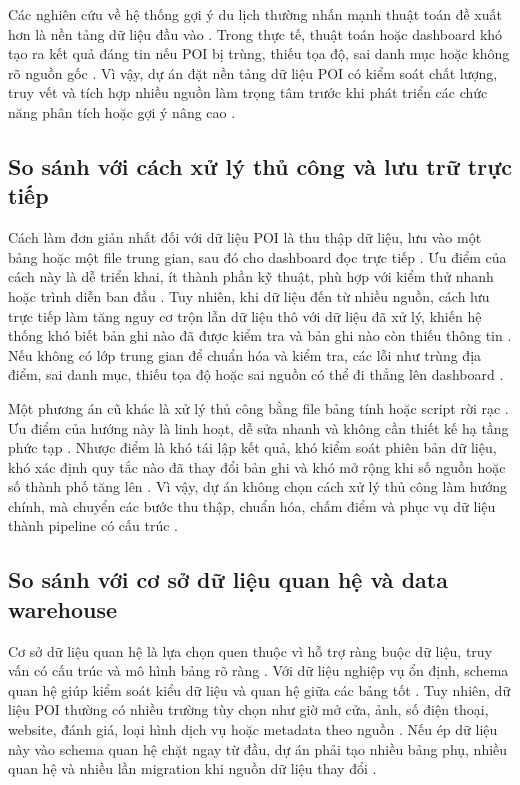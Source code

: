 \documentclass[12pt,a4paper]{article}
\begin{document}
Các nghiên cứu về hệ thống gợi ý du lịch thường nhấn mạnh thuật toán đề xuất hơn là nền tảng dữ liệu đầu vào \cite{zhang2023}. Trong thực tế, thuật toán hoặc dashboard khó tạo ra kết quả đáng tin nếu POI bị trùng, thiếu tọa độ, sai danh mục hoặc không rõ nguồn gốc \cite{ibmDataQuality}. Vì vậy, dự án đặt nền tảng dữ liệu POI có kiểm soát chất lượng, truy vết và tích hợp nhiều nguồn làm trọng tâm trước khi phát triển các chức năng phân tích hoặc gợi ý nâng cao \cite{zhang2023}.\par

\subsection{So sánh với cách xử lý thủ công và lưu trữ trực tiếp}

Cách làm đơn giản nhất đối với dữ liệu POI là thu thập dữ liệu, lưu vào một bảng hoặc một file trung gian, sau đó cho dashboard đọc trực tiếp \cite{ibmETL}. Ưu điểm của cách này là dễ triển khai, ít thành phần kỹ thuật, phù hợp với kiểm thử nhanh hoặc trình diễn ban đầu \cite{ibmETL}. Tuy nhiên, khi dữ liệu đến từ nhiều nguồn, cách lưu trực tiếp làm tăng nguy cơ trộn lẫn dữ liệu thô với dữ liệu đã xử lý, khiến hệ thống khó biết bản ghi nào đã được kiểm tra và bản ghi nào còn thiếu thông tin \cite{ibmDataQuality}. Nếu không có lớp trung gian để chuẩn hóa và kiểm tra, các lỗi như trùng địa điểm, sai danh mục, thiếu tọa độ hoặc sai nguồn có thể đi thẳng lên dashboard \cite{yeboah2021}.\par

Một phương án cũ khác là xử lý thủ công bằng file bảng tính hoặc script rời rạc \cite{ibmETL}. Ưu điểm của hướng này là linh hoạt, dễ sửa nhanh và không cần thiết kế hạ tầng phức tạp \cite{ibmETL}. Nhược điểm là khó tái lập kết quả, khó kiểm soát phiên bản dữ liệu, khó xác định quy tắc nào đã thay đổi bản ghi và khó mở rộng khi số nguồn hoặc số thành phố tăng lên \cite{ibmLineage}. Vì vậy, dự án không chọn cách xử lý thủ công làm hướng chính, mà chuyển các bước thu thập, chuẩn hóa, chấm điểm và phục vụ dữ liệu thành pipeline có cấu trúc \cite{ibmETL}.\par

\subsection{So sánh với cơ sở dữ liệu quan hệ và data warehouse}

Cơ sở dữ liệu quan hệ là lựa chọn quen thuộc vì hỗ trợ ràng buộc dữ liệu, truy vấn có cấu trúc và mô hình bảng rõ ràng \cite{ibmWarehouseLake}. Với dữ liệu nghiệp vụ ổn định, schema quan hệ giúp kiểm soát kiểu dữ liệu và quan hệ giữa các bảng tốt \cite{ibmWarehouseLake}. Tuy nhiên, dữ liệu POI thường có nhiều trường tùy chọn như giờ mở cửa, ảnh, số điện thoại, website, đánh giá, loại hình dịch vụ hoặc metadata theo nguồn \cite{mongodbDataModel}. Nếu ép dữ liệu này vào schema quan hệ chặt ngay từ đầu, dự án phải tạo nhiều bảng phụ, nhiều quan hệ và nhiều lần migration khi nguồn dữ liệu thay đổi \cite{mongodbDataModel}.\par
\end{document}
